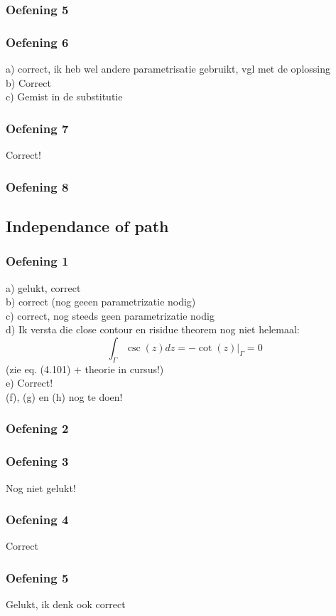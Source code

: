 \documentclass[a4paper,twoside]{article}
\theoremstyle{definition}
\theoremstyle{plain}
\begin{document}
\subsubsection{Oefening 5}
\subsubsection{Oefening 6}
a) correct, ik heb wel andere parametrisatie gebruikt, vgl met de oplossing \\
b) Correct \\
c) Gemist in de substitutie\\
\subsubsection{Oefening 7}
Correct!
\subsubsection{Oefening 8}
\subsection{Independance of path}
\subsubsection{Oefening 1}
a) gelukt, correct \\
b) correct (nog geeen parametrizatie nodig)\\
c) correct, nog steeds geen parametrizatie nodig\\
d) Ik versta die close contour en risidue theorem nog niet helemaal:
\[
\int_\Gamma \csc(z)dz =-\cot(z)|_\Gamma = 0
\] (zie eq. (4.101) + theorie in cursus!)\\
e) Correct! \\
(f), (g) en (h) nog te doen!
\subsubsection{Oefening 2}
\subsubsection{Oefening 3}
Nog niet gelukt!
\subsubsection{Oefening 4}
Correct
\subsubsection{Oefening 5}
Gelukt, ik denk ook correct
\end{document}
